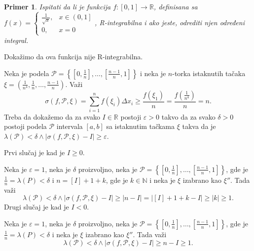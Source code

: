 \documentclass{article}
\newtheorem{prim}{Primer}[section]
\begin{document}
\begin{primbox}
    \label{primer_2.3}
    \begin{prim}
        Ispitati da li je funkcija $f:\left[0,1\right]\rightarrow\mathbb{R}$, definisana sa
        $f\left(x\right)=
            \begin{cases}
                \frac{1}{\sqrt{x}}, & x \in \left(0,1\right] \\
                0,                  & x =0
            \end{cases}$, R-integrabilna i ako jeste, odrediti njen određeni integral.
    \end{prim}
    Dokažimo da ova funkcija nije R-integrabilna.\par
    Neka je podela $\displaystyle\mathcal{P}=\left\{\left[0,\frac{1}{n}\right],\dotsc,\left[\frac{n-1}{n},1\right]\right\}$
    i neka je $n$-torka istaknutih tačaka $\xi=\left(\frac{1}{n^4},\frac{1}{n},\dotsc,\frac{n-1}{n}\right)$. Važi
    $$\sigma\left(f,\mathcal{P},\xi\right)=\sum_{i=1}^{n}f\left(\xi_i\right)\Delta x_i\geq \frac{f\left(\xi_1\right)}{n}=\frac{f\left(\frac{1}{n^4}\right)}{n}=n.$$
    Treba da dokažemo da za svako $I\in\mathbb{R}$ postoji $\varepsilon>0$ takvo da za svako $\delta>0$ postoji podela $\mathcal{P}$
    intervala $\left[a,b\right]$ sa istaknutim tačkama $\xi$ takva da je $\lambda(\mathcal{P})<\delta\land\left|\sigma\left(f,\mathcal{P},\xi\right)-I\right|\geq\varepsilon$.\par
    Prvi slučaj je kad je $I\geq0$.\par
    Neka je $\varepsilon=1$, neka je $\delta$ proizvoljno,
    neka je $\displaystyle\mathcal{P}=\left\{\left[0,\frac{1}{n}\right],\dotsc,\left[\frac{n-1}{n},1\right]\right\}$,
    gde je $\displaystyle\frac{1}{n}=\lambda\left(P\right)<\delta$  i $n=\left[I\right]+1+k$, gde je $k\in\mathbb{N}$ i neka je $\xi$ izabrano kao $\xi''$. Tada
    važi
    $$\lambda\left(\mathcal{P}\right)<\delta\land\left|\sigma\left(f,\mathcal{P},\xi\right)-I\right|\geq\left|n-I\right|=\left|\left[I\right]+1+k-I\right|\geq\left|k\right|\geq1.$$
    Drugi slučaj je kad je $I<0$.\par
    Neka je $\varepsilon=1$, neka je $\delta$ proizvoljno,
    neka je $\displaystyle\mathcal{P}=\left\{\left[0,\frac{1}{n}\right],\dotsc,\left[\frac{n-1}{n},1\right]\right\}$,
    gde je $\displaystyle\frac{1}{n}=\lambda\left(P\right)<\delta$ i neka je $\xi$ izabrano kao $\xi''$. Tada
    važi
    $$\lambda\left(\mathcal{P}\right)<\delta\land\left|\sigma\left(f,\mathcal{P},\xi\right)-I\right|\geq n-I\geq1.$$

\end{primbox}
\end{document}
